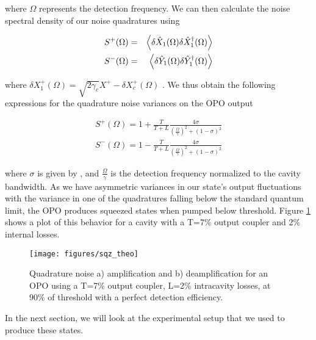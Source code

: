 \noindent
where $\Omega $ represents the detection frequency.  We can then calculate the noise spectral density of our noise quadratures using 


\begin{eqnarray}
  \label{eq:noise_spec}
  S^+(\Omega ) & = & \left< \delta \hat{X}_1(\Omega)\delta \hat{X}^{\dagger}_1(\Omega) \right> \\
  S^-(\Omega ) & = & \left< \delta \hat{Y}_1(\Omega)\delta \hat{Y}^{\dagger}_1(\Omega) \right> 
\end{eqnarray}
  
\noindent
where $\delta X^+_1(\Omega ) = \sqrt{2 \gamma _c}  X^+  - \delta X^+_c(\Omega )$ \cite{LamPhD}.  We thus obtain the following expressions for the quadrature noise variances on the OPO output

\begin{eqnarray}
  \label{eq:opo_var_out}
  S^+(\Omega ) = 1 + \frac{T}{T+L} \frac{4 \sigma}{ (\frac{\Omega}{\gamma})^2  + (1 - \sigma)^2 } \\
  S^-(\Omega ) = 1 - \frac{T}{T+L} \frac{4 \sigma}{ (\frac{\Omega}{\gamma})^2  + (1 - \sigma)^2 } 
\end{eqnarray}

\noindent
where $\sigma$ is given by , and $\frac{\Omega}{\gamma}$ is the detection frequency normalized to the cavity bandwidth.  As we have asymmetric variances in our state's output fluctuations with the variance in one of the quadratures falling below the standard quantum limit, the OPO produces squeezed states when pumped below threshold.  Figure \ref{fig:sqz_theo} shows a plot of this behavior for a cavity with a T=7\% output coupler and 2\% internal losses.


\begin{figure}[!htb] 
 \centering 
 \texttt{[image: figures/sqz\_theo]} 
 \caption[OPO squeezing]{Quadrature noise a) amplification and b) deamplification for an OPO using a T=7\% output coupler, L=2\% intracavity losses, at 90\% of threshold with a perfect detection efficiency.} 
 \label{fig:sqz_theo} 
\end{figure}

\noindent
In the next section, we will look at the experimental setup that we used to produce these states.
